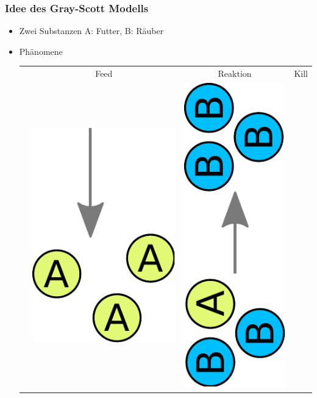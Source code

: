 \documentclass[12pt]{beamer}
\begin{document}
    \begin{frame}
      \frametitle{Idee des Gray-Scott Modells}
      \begin{itemize}
      \item Zwei Substanzen A: Futter, B: Räuber
      \item Phänomene
      \begin{tabular}{ r c c c }
	  & Feed & Reaktion & Kill \\
	  &
      \includegraphics[scale=0.15]{Bilder/gs_feed.pdf}
	  &
      \includegraphics[scale=0.15,angle=-90,origin=c]{Bilder/gs_reaction.pdf}

\end{tabular}
\end{itemize}
\end{frame}
\end{document}
